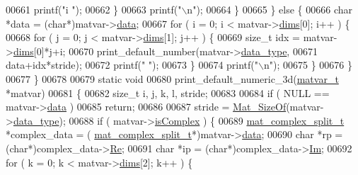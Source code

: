 \begin{DoxyCode}
{{{{{{{{{{{{{{{{{{{{{{{{{{{{{{{{{{{{{00661                 printf(\textcolor{stringliteral}{"i "});
00662             \}
00663             printf(\textcolor{stringliteral}{"\(\backslash\)n"});
00664         \}
00665     \} \textcolor{keywordflow}{else} \{
00666         \textcolor{keywordtype}{char} *data = (\textcolor{keywordtype}{char}*)matvar->\hyperlink{group___m_a_t_a5672978efa230bbdecdf38ede781f7fa}{data};
00667         for ( i = 0; i < matvar->\hyperlink{group___m_a_t_a8e01234e1c862ce3472bb37f5a09b92c}{dims}[0]; i++ ) \{
00668             \textcolor{keywordflow}{for} ( j = 0; j < matvar->\hyperlink{group___m_a_t_a8e01234e1c862ce3472bb37f5a09b92c}{dims}[1]; j++ ) \{
00669                 \textcolor{keywordtype}{size\_t} idx = matvar->\hyperlink{group___m_a_t_a8e01234e1c862ce3472bb37f5a09b92c}{dims}[0]*j+i;
00670                 print\_default\_number(matvar->\hyperlink{group___m_a_t_ab6aafe9bd77f0f077852593dec438144}{data\_type},
00671                                 data+idx*stride);
00672                 printf(\textcolor{stringliteral}{" "});
00673             \}
00674             printf(\textcolor{stringliteral}{"\(\backslash\)n"});
00675         \}
00676     \}
00677 \}
00678 
00679 \textcolor{keyword}{static} \textcolor{keywordtype}{void}
00680 print\_default\_numeric\_3d(\hyperlink{group___m_a_t_structmatvar__t}{matvar\_t} *matvar)
00681 \{
00682     \textcolor{keywordtype}{size\_t} i, j, k, l, stride;
00683 
00684     \textcolor{keywordflow}{if} ( NULL == matvar->\hyperlink{group___m_a_t_a5672978efa230bbdecdf38ede781f7fa}{data} )
00685         \textcolor{keywordflow}{return};
00686 
00687     stride = \hyperlink{group__mat__util_gab6774aabdc124c540c1e7686d0804940}{Mat\_SizeOf}(matvar->\hyperlink{group___m_a_t_ab6aafe9bd77f0f077852593dec438144}{data\_type});
00688     \textcolor{keywordflow}{if} ( matvar->\hyperlink{group___m_a_t_aeb03b3a69f108dc05470b00443a43739}{isComplex} ) \{
00689         \hyperlink{group___m_a_t_structmat__complex__split__t}{mat\_complex\_split\_t} *complex\_data = (
      \hyperlink{group___m_a_t_structmat__complex__split__t}{mat\_complex\_split\_t}*)matvar->\hyperlink{group___m_a_t_a5672978efa230bbdecdf38ede781f7fa}{data};
00690         \textcolor{keywordtype}{char} *rp = (\textcolor{keywordtype}{char}*)complex\_data->\hyperlink{group___m_a_t_a484a93607508adac2bce53a0252e0325}{Re};
00691         \textcolor{keywordtype}{char} *ip = (\textcolor{keywordtype}{char}*)complex\_data->\hyperlink{group___m_a_t_a7182d10b0d3598415887376065440946}{Im};
00692         for ( k = 0; k < matvar->\hyperlink{group___m_a_t_a8e01234e1c862ce3472bb37f5a09b92c}{dims}[2]; k++ ) \{
}}}}}}}}}}}}}}}}}}}}}}}}}}}}}}}}}}}}}
\end{DoxyCode}
